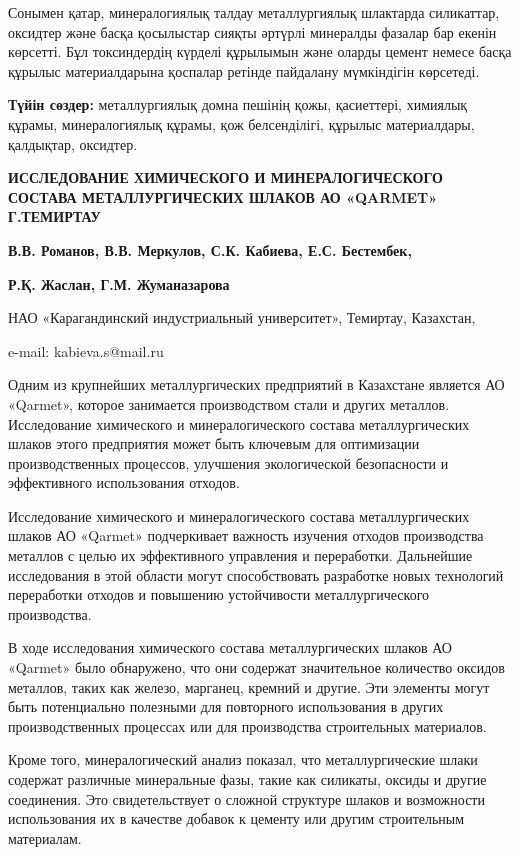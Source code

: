 Сонымен қатар, минералогиялық талдау металлургиялық шлактарда
силикаттар, оксидтер және басқа қосылыстар сияқты әртүрлі минералды
фазалар бар екенін көрсетті. Бұл токсиндердің күрделі құрылымын және
оларды цемент немесе басқа құрылыс материалдарына қоспалар ретінде
пайдалану мүмкіндігін көрсетеді.

\textbf{Түйін сөздер:} металлургиялық домна пешінің қожы, қасиеттері,
химиялық құрамы, минералогиялық құрамы, қож белсенділігі, құрылыс
материалдары, қалдықтар, оксидтер.

\textbf{ИССЛЕДОВАНИЕ ХИМИЧЕСКОГО И МИНЕРАЛОГИЧЕСКОГО СОСТАВА
МЕТАЛЛУРГИЧЕСКИХ ШЛАКОВ АО «QARMET» Г.ТЕМИРТАУ}

\textbf{В.В. Романов, В.В. Меркулов, С.К. Кабиева, Е.С. Бестембек,}

\textbf{Р.Қ. Жаслан, Г.М. Жуманазарова}

НАО «Карагандинский индустриальный университет», Темиртау, Казахстан,

e-mail: kabieva.s@mail.ru

Одним из крупнейших металлургических предприятий в Казахстане является
АО «Qarmet», которое занимается производством стали и других металлов.
Исследование химического и минералогического состава металлургических
шлаков этого предприятия может быть ключевым для оптимизации
производственных процессов, улучшения экологической безопасности и
эффективного использования отходов.

Исследование химического и минералогического состава металлургических
шлаков АО «Qarmet» подчеркивает важность изучения отходов производства
металлов с целью их эффективного управления и переработки. Дальнейшие
исследования в этой области могут способствовать разработке новых
технологий переработки отходов и повышению устойчивости
металлургического производства.

В ходе исследования химического состава металлургических шлаков АО
«Qarmet» было обнаружено, что они содержат значительное количество
оксидов металлов, таких как железо, марганец, кремний и другие. Эти
элементы могут быть потенциально полезными для повторного использования
в других производственных процессах или для производства строительных
материалов.

Кроме того, минералогический анализ показал, что металлургические шлаки
содержат различные минеральные фазы, такие как силикаты, оксиды и другие
соединения. Это свидетельствует о сложной структуре шлаков и возможности
использования их в качестве добавок к цементу или другим строительным
материалам.

